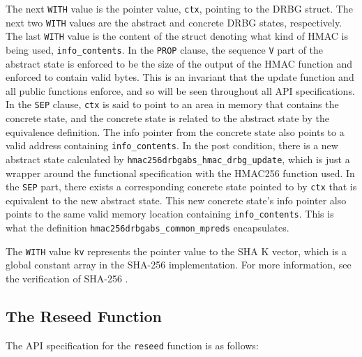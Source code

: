 \documentclass[pageno]{jpaper}
\begin{document}
The next \lstinline{WITH} value is the pointer value, \lstinline{ctx}, pointing to the DRBG struct. The next two \lstinline{WITH} values are the abstract and concrete DRBG states, respectively. The last \lstinline{WITH} value is the content of the struct denoting what kind of HMAC is being used, \lstinline{info_contents}. In the \lstinline{PROP} clause, the sequence \lstinline{V} part of the abstract state is enforced to be the size of the output of the HMAC function and enforced to contain valid bytes. This is an invariant that the update function and all public functions enforce, and so will be seen throughout all API specifications. In the \lstinline{SEP} clause, \lstinline{ctx} is said to point to an area in memory that contains the concrete state, and the concrete state is related to the abstract state by the equivalence definition. The info pointer from the concrete state also points to a valid address containing \lstinline{info_contents}. In the post condition, there is a new abstract state calculated by \lstinline{hmac256drbgabs_hmac_drbg_update}, which is just a wrapper around the functional specification with the HMAC256 function used. In the \lstinline{SEP} part, there exists a corresponding concrete state pointed to by \lstinline{ctx} that is equivalent to the new abstract state. This new concrete state’s info pointer also points to the same valid memory location containing \lstinline{info_contents}. This is what the definition \lstinline{hmac256drbgabs_common_mpreds} encapsulates.

The \lstinline{WITH} value \lstinline{kv} represents the pointer value to the SHA K vector, which is a global constant array in the SHA-256 implementation. For more information, see the verification of SHA-256 \cite{sha}.

\subsection{The Reseed Function}

The API specification for the \lstinline{reseed} function is as follows:
\end{document}
